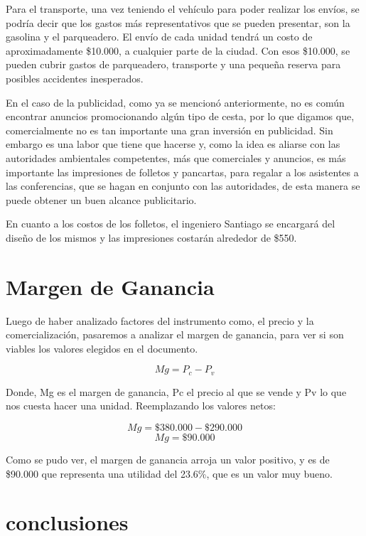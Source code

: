 \documentclass{report}
\begin{document}
    Para el transporte, una vez teniendo el vehículo para poder realizar los envíos, se podría decir que los gastos más representativos que se pueden presentar, son la gasolina y el parqueadero. El envío de cada unidad tendrá un costo de aproximadamente \$10.000, a cualquier parte de la ciudad. Con esos \$10.000, se pueden cubrir gastos de parqueadero, transporte y una pequeña reserva para posibles accidentes inesperados.

    En el caso de la publicidad, como ya se mencionó anteriormente, no es común encontrar anuncios promocionando algún tipo de cesta, por lo que digamos que, comercialmente no es tan importante una gran inversión en publicidad. Sin embargo es una labor que tiene que hacerse y, como la idea es aliarse con las autoridades ambientales competentes, más que comerciales  y anuncios, es más importante las impresiones de folletos y pancartas, para regalar a los asistentes a las conferencias, que se hagan en conjunto con las autoridades, de esta manera se puede obtener un buen alcance publicitario.

    En cuanto a los costos de los folletos, el ingeniero Santiago se encargará del diseño de los mismos y las impresiones costarán alrededor de \$550.

    \section{Margen de Ganancia}
    Luego de haber analizado factores del instrumento como, el precio y la comercialización, pasaremos a analizar el margen de ganancia, para ver si son viables los valores elegidos en el documento.

    \[Mg = P_{c} - P_{v}\]

    Donde, Mg es el margen de ganancia, Pc el precio al que se vende y Pv lo que nos cuesta hacer una unidad. Reemplazando los valores netos:

    \[Mg = \$ 380.000 - \$ 290.000\]
    \[Mg = \$ 90.000\]

    Como se pudo ver, el margen de ganancia arroja un valor positivo, y es de \$90.000 que representa una utilidad del 23.6\%, que es un valor muy bueno.

    \section{conclusiones}
\end{document}
